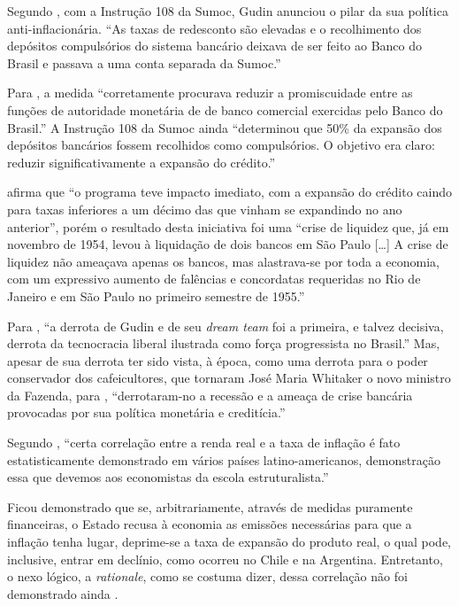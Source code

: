 \documentclass[
	10pt,				%
	openright,			%
	twoside,			%
	a5paper,			%
	english,			%
	french,				%
	spanish,			%
	brazil				%
	]{abntex2}
\renewenvironment{quote}
  {\small\list{}{\rightmargin=0.1cm \leftmargin=4cm}%
   \item\relax}
  {\endlist}
\begin{document}
Segundo , com a Instrução 108 da Sumoc,
Gudin anunciou o pilar da sua política anti-inflacionária. ``As taxas de
redesconto são elevadas e o recolhimento dos depósitos compulsórios do
sistema bancário deixava de ser feito ao Banco do Brasil e passava a uma
conta separada da Sumoc.''

Para , a medida ``corretamente procurava
reduzir a promiscuidade entre as funções de autoridade monetária de de
banco comercial exercidas pelo Banco do Brasil.'' A Instrução 108 da
Sumoc ainda ``determinou que 50\% da expansão dos depósitos bancários
fossem recolhidos como compulsórios. O objetivo era claro: reduzir
significativamente a expansão do crédito.''

 afirma que ``o programa teve impacto
imediato, com a expansão do crédito caindo para taxas inferiores a um
décimo das que vinham se expandindo no ano anterior'', porém o resultado
desta iniciativa foi uma ``crise de liquidez que, já em novembro de
1954, levou à liquidação de dois bancos em São Paulo {[}\ldots{}{]} A
crise de liquidez não ameaçava apenas os bancos, mas alastrava-se por
toda a economia, com um expressivo aumento de falências e concordatas
requeridas no Rio de Janeiro e em São Paulo no primeiro semestre de
1955.''

Para , ``a derrota de Gudin e de seu
\emph{dream team} foi a primeira, e talvez decisiva, derrota da
tecnocracia liberal ilustrada como força progressista no Brasil.'' Mas,
apesar de sua derrota ter sido vista, à época, como uma derrota para o
poder conservador dos cafeicultores, que tornaram José Maria Whitaker o
novo ministro da Fazenda, para ,
``derrotaram-no a recessão e a ameaça de crise bancária provocadas por
sua política monetária e creditícia.''

Segundo , ``certa correlação entre a
renda real e a taxa de inflação é fato estatisticamente demonstrado em
vários países latino-americanos, demonstração essa que devemos aos
economistas da escola estruturalista.''

\begin{quote}
Ficou demonstrado que se, arbitrariamente, através de medidas puramente
financeiras, o Estado recusa à economia as emissões necessárias para que
a inflação tenha lugar, deprime-se a taxa de expansão do produto real, o
qual pode, inclusive, entrar em declínio, como ocorreu no Chile e na
Argentina. Entretanto, o nexo lógico, a \emph{rationale}, como se
costuma dizer, dessa correlação não foi demonstrado ainda
\cite[p.~595]{rangel1963}.
\end{quote}
\end{document}
